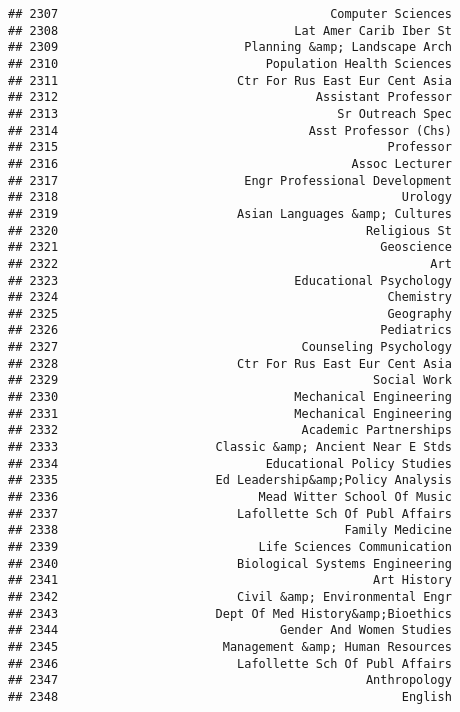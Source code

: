 \documentclass[
]{article}
\begin{document}
\begin{verbatim}
## 2307                                      Computer Sciences
## 2308                                 Lat Amer Carib Iber St
## 2309                          Planning &amp; Landscape Arch
## 2310                             Population Health Sciences
## 2311                         Ctr For Rus East Eur Cent Asia
## 2312                                    Assistant Professor
## 2313                                       Sr Outreach Spec
## 2314                                   Asst Professor (Chs)
## 2315                                              Professor
## 2316                                         Assoc Lecturer
## 2317                          Engr Professional Development
## 2318                                                Urology
## 2319                         Asian Languages &amp; Cultures
## 2320                                           Religious St
## 2321                                             Geoscience
## 2322                                                    Art
## 2323                                 Educational Psychology
## 2324                                              Chemistry
## 2325                                              Geography
## 2326                                             Pediatrics
## 2327                                  Counseling Psychology
## 2328                         Ctr For Rus East Eur Cent Asia
## 2329                                            Social Work
## 2330                                 Mechanical Engineering
## 2331                                 Mechanical Engineering
## 2332                                  Academic Partnerships
## 2333                      Classic &amp; Ancient Near E Stds
## 2334                             Educational Policy Studies
## 2335                      Ed Leadership&amp;Policy Analysis
## 2336                            Mead Witter School Of Music
## 2337                         Lafollette Sch Of Publ Affairs
## 2338                                        Family Medicine
## 2339                            Life Sciences Communication
## 2340                         Biological Systems Engineering
## 2341                                            Art History
## 2342                         Civil &amp; Environmental Engr
## 2343                      Dept Of Med History&amp;Bioethics
## 2344                               Gender And Women Studies
## 2345                       Management &amp; Human Resources
## 2346                         Lafollette Sch Of Publ Affairs
## 2347                                           Anthropology
## 2348                                                English

\end{verbatim}
\end{document}
